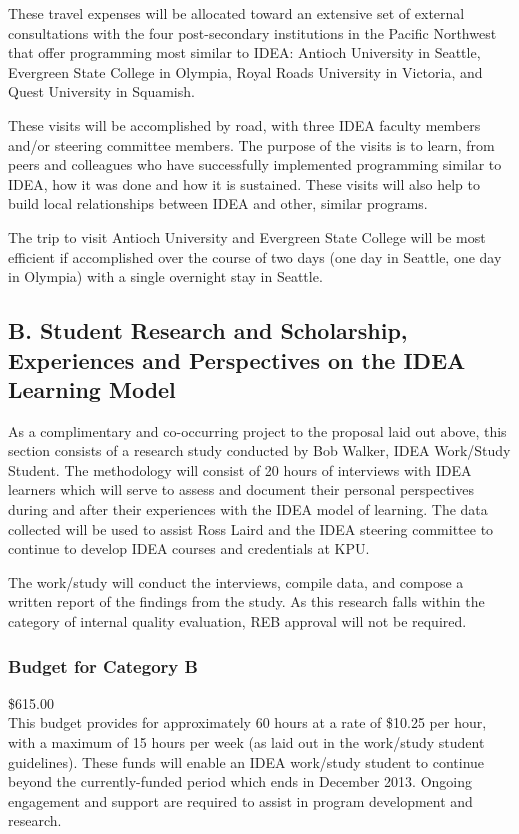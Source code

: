 \documentclass[11pt, letterpaper]{article}
\begin{document}
These travel expenses will be allocated toward an extensive set of
external consultations with the four post-secondary institutions in
the Pacific Northwest that offer programming most similar to IDEA:
Antioch University in Seattle, Evergreen State College in Olympia,
Royal Roads University in Victoria, and Quest University in Squamish.

These visits will be accomplished by road, with three IDEA faculty
members and/or steering committee members. The purpose of the visits
is to learn, from peers and colleagues who have successfully
implemented programming similar to IDEA, how it was done and how it is
sustained. These visits will also help to build local relationships
between IDEA and other, similar programs.

The trip to visit Antioch University and Evergreen State College will be most efficient if accomplished over the course of two days (one day in Seattle, one day in Olympia) with a single overnight stay in Seattle.

\subsection{B. Student Research and Scholarship,\\
Experiences and Perspectives on the IDEA Learning Model}

As a complimentary and co-occurring project to the proposal laid out
above, this section consists of a research study conducted by Bob
Walker, IDEA Work/Study Student. The methodology will consist of 20
hours of interviews with IDEA learners which will serve to assess and
document their personal perspectives during and after their experiences
with the IDEA model of learning. The data collected will be used to
assist Ross Laird and the IDEA steering committee to continue to develop
IDEA courses and credentials at KPU.

The work/study will conduct the interviews, compile data, and compose a
written report of the findings from the study. As this research falls
within the category of internal quality evaluation, REB approval will
not be required.

\subsubsection{Budget for Category B}
\$615.00\\[1em]
\noindent
This budget provides for approximately 60 hours at a rate of \$10.25 per
hour, with a maximum of 15 hours per week (as laid out in the work/study
student guidelines). These funds will enable an IDEA work/study student
to continue beyond the currently-funded period which ends in December
2013. Ongoing engagement and support are required to assist in program
development and research.
\end{document}
